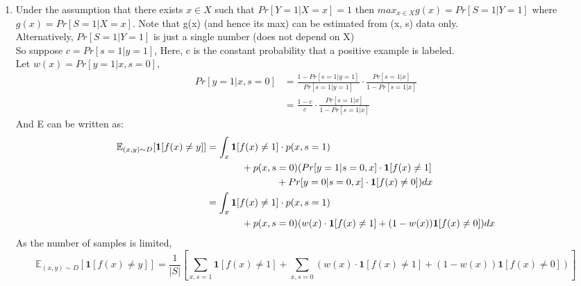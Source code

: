 \documentclass[12pt]{article}
\begin{document}
\begin{enumerate}
	\item 
	Under the assumption that there exists $x\in X$ such that $Pr[Y=1|X=x]=1$ then $max_{x\in X}g(x)=Pr[S=1|Y=1]$ where $g(x)=Pr[S=1|X=x]$. Note that g(x) (and hence its max) can be estimated from (x, s) data only.\\
	Alternatively, $Pr[S=1|Y=1]$ is just a single number (does not depend on X)\\
	So suppose $c=Pr[s=1|y=1]$, Here, c is the constant probability that a positive example is labeled.\\
	Let $w(x)=Pr[y=1|x,s=0]$, 
	\begin{align*}
	Pr[y=1|x,s=0] &=\frac{1-Pr[s=1|y=1]}{Pr[s=1|y=1]}\cdot \frac{Pr[s=1|x]}{1-Pr[s=1|x]} \\ 
	&=\frac{1-c}{c}\cdot \frac{Pr[s=1|x]}{1-Pr[s=1|x]}
	\end{align*}
	And E can be written as:\\
	\begin{align*}
	\mathbb{E}_{(x,y)\sim D}[\textbf{1}[f(x)\neq y]] &= \int_x \mathbf{1}[f(x)\neq 1]\cdot p(x,s=1)\\
	&\hspace*{0.5in}+p(x,s=0)(Pr[y = 1 | s = 0, x]\cdot \mathbf{1}[f (x)\neq 1]\\
	&\hspace*{1in}+Pr[y = 0 | s = 0, x]\cdot \mathbf{1}[f (x)\neq 0])dx\\
	&=\int_x \mathbf{1}[f(x)\neq 1]\cdot p(x,s=1)\\
	&\hspace*{0.5in}+p(x,s=0)(w(x)\cdot \mathbf{1}[f (x)\neq 1]+(1-w(x))\mathbf{1}[f (x)\neq 0])dx\\
	\end{align*}
	As the number of samples is limited,\\
	$$\mathbb{E}_{(x,y)\sim D}[\textbf{1}[f(x)\neq y]]=\frac{1}{|S|}\left [ \sum_{x,s=1}\mathbf{1}[f(x)\neq 1]+\sum_{x,s=0}(w(x)\cdot \mathbf{1}[f(x)\neq 1]+(1-w(x))\mathbf{1}[f (x)\neq 0]) \right ]$$
	
	
	
\end{enumerate}


\end{document}
